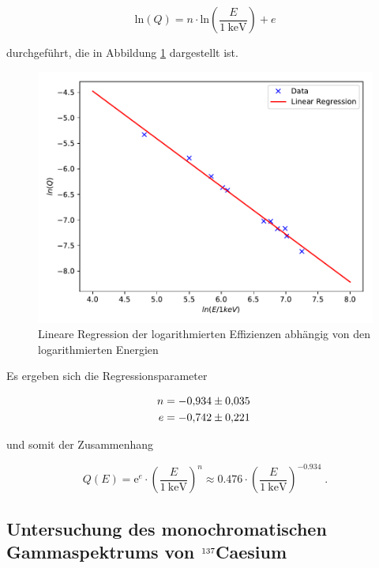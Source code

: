 \begin{equation}
  \text{ln}(Q) = n \cdot \text{ln}(\frac{E}{\SI{1}{\kilo\eV}}) + e
\end{equation}

durchgeführt, die in Abbildung \ref{fig:plot6} dargestellt ist.

\begin{figure}
  \centering
  \includegraphics{content/plot6.pdf}
  \caption{Lineare Regression der logarithmierten Effizienzen abhängig von den logarithmierten Energien}
  \label{fig:plot6}
\end{figure}

Es ergeben sich die Regressionsparameter

\begin{align*}
  n &= \num{-0.934 +- 0.035} \\
  e &= \num{-0.742 +- 0.221} \; 
\end{align*}

und somit der Zusammenhang

\begin{equation}
  Q(E) = \text{e}^e \cdot \left(\frac{E}{\SI{1}{\kilo\eV}}\right)^n 
  \approx \num{0.476} \cdot \left(\frac{E}{\SI{1}{\kilo\eV}}\right)^{\num{-0.934}} \; .
\end{equation}


\subsection{Untersuchung des monochromatischen Gammaspektrums von $\ce{^{137}}$Caesium}

